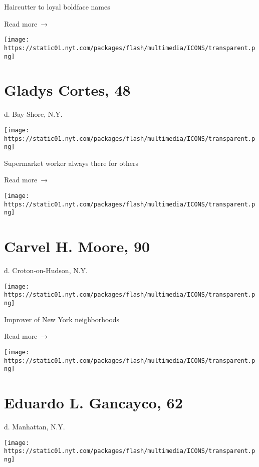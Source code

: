 Haircutter to loyal boldface names

 Read more~→

\href{https://www.nytimes.com/2020/05/29/nyregion/gladys-cortes-dead-coronavirus.html}{}

\texttt{[image: https://static01.nyt.com/packages/flash/multimedia/ICONS/transparent.png]}

\hypertarget{gladys-cortes-48}{%
\section{Gladys Cortes, 48}\label{gladys-cortes-48}}

d. Bay Shore, N.Y.

\texttt{[image: https://static01.nyt.com/packages/flash/multimedia/ICONS/transparent.png]}

Supermarket worker always there for others

 Read more~→

\href{https://www.nytimes.com/2020/05/28/obituaries/carvel-moore-dead-coronavirus.html}{}

\texttt{[image: https://static01.nyt.com/packages/flash/multimedia/ICONS/transparent.png]}

\hypertarget{carvel-h-moore-90}{%
\section{Carvel H. Moore, 90}\label{carvel-h-moore-90}}

d. Croton-on-Hudson, N.Y.

\texttt{[image: https://static01.nyt.com/packages/flash/multimedia/ICONS/transparent.png]}

Improver of New York neighborhoods

 Read more~→

\href{https://www.nytimes.com/2020/05/28/nyregion/eduardo-l-gancayco-dead-coronavirus.html}{}

\texttt{[image: https://static01.nyt.com/packages/flash/multimedia/ICONS/transparent.png]}

\hypertarget{eduardo-l-gancayco-62}{%
\section{Eduardo L. Gancayco, 62}\label{eduardo-l-gancayco-62}}

d. Manhattan, N.Y.

\texttt{[image: https://static01.nyt.com/packages/flash/multimedia/ICONS/transparent.png]}

